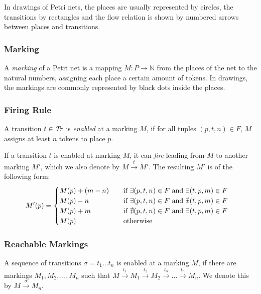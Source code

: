 In drawings of Petri nets, the places are usually represented by circles, the transitions by rectangles and the flow relation is shown by numbered arrows between places and transitions.

\subsubsection{Marking}
A \emph{marking} of a Petri net is a mapping $M : P \rightarrow \mathbb{N}$ from the places of the net to the natural numbers, assigning each place a certain amount of tokens. In drawings, the markings are commonly represented by black dots inside the places.


\subsubsection{Firing Rule}
A transition $t \in \mathit{Tr}$ is \emph{enabled} at a marking $M$, if for all tuples $(p,t,n) \in F$, $M$ assigns at least $n$ tokens to place $p$.

If a transition $t$ is enabled at marking $M$, it can \emph{fire} leading from $M$ to another marking $M'$, which we also denote by  $M \xrightarrow{t} M'$. 
The resulting $M'$ is of the following form:
\begin{equation*}
M'(p) =  
\begin{cases}
\mathrlap{M(p) + (m - n)}\hphantom{M(p) + (m - n) + 1} \text{ if } \exists (p,t,n) \in F \text{ and } \exists (t,p,m) \in F \\
\mathrlap{M(p) - n}\hphantom{M(p) + (m - n) + 1} \text{ if } \exists (p,t,n) \in F \text{ and } \nexists (t,p,m) \in F \\
\mathrlap{M(p) + m}\hphantom{M(p) + (m - n) + 1} \text{ if }  \nexists (p,t,n) \in F \text{ and } \exists (t,p,m) \in F  \\
\mathrlap{M(p)}\hphantom{M(p) + (m - n) + 1} \text{ otherwise}
\end{cases}
\end{equation*}

\subsubsection{Reachable Markings}
A sequence of transitions $\sigma = t_{1} \dots t_{n}$ is enabled at a marking $M$, if there are markings $M_{1},M_{2},\dots,M_{n}$ such that $M \xrightarrow{t_{1}} M_{1} \xrightarrow{t_{2}} M_{2} \xrightarrow{t_{3}} \dots \xrightarrow{t_{n}} M_{n}$. We denote this by $M \xrightarrow{\sigma} M_{n}$. 

